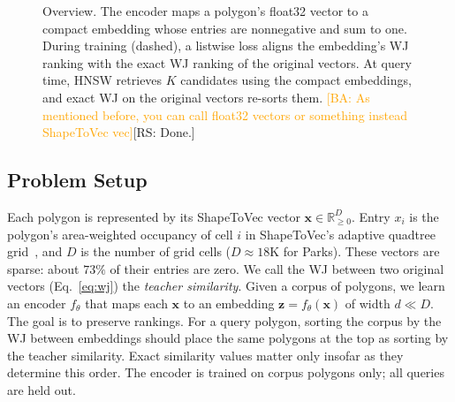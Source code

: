 \documentclass[conference]{IEEEtran}
\newcommand{\rs}[1]{\textcolor{green!55!black}{[RS: #1]}}
\newcommand{\ba}[1]{\textcolor{orange}{[BA: #1]}}
\begin{document}
\begin{figure}[t]\centering
{}
\caption{Overview. The encoder maps a polygon's float32 vector to a compact
embedding whose entries are nonnegative and sum to one. During training (dashed), a
listwise loss aligns the embedding's WJ ranking with the exact WJ ranking of the
original vectors. At query time, HNSW retrieves $K$ candidates using the compact
embeddings, and exact WJ on the original vectors re-sorts them. \ba{As mentioned before, you can call float32 vectors or something instead ShapeToVec vec}\rs{Done.}}
\label{fig:pipeline}
\end{figure}

\subsection{Problem Setup}
\label{sec:setup}
Each polygon is represented by its ShapeToVec vector
$\mathbf{x}\in\mathbb{R}^{D}_{\ge0}$. Entry $x_i$ is the polygon's area-weighted
occupancy of cell $i$ in ShapeToVec's adaptive quadtree grid~\cite{shape2vec}, and
$D$ is the number of grid cells ($D\approx18$K for Parks). These vectors are sparse:
about $73\%$ of their entries are zero. We call the WJ between two original vectors
(Eq.~\ref{eq:wj}) the \emph{teacher similarity}. Given a corpus of polygons, we learn
an encoder $f_\theta$ that maps each $\mathbf{x}$ to an embedding
$\mathbf{z}=f_\theta(\mathbf{x})$ of width $d\ll D$. The goal is to preserve rankings.
For a query polygon, sorting the corpus by the WJ between embeddings should place the
same polygons at the top as sorting by the teacher similarity. Exact similarity values
matter only insofar as they determine this order. The encoder is trained on corpus
polygons only; all queries are held out.
\end{document}
